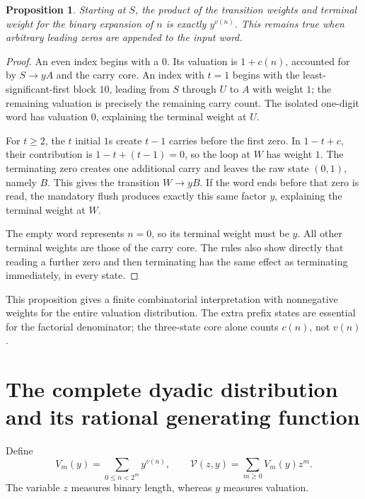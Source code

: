 \documentclass[11pt]{article}
\newtheorem{proposition}[theorem]{Proposition}
\theoremstyle{definition}\newtheorem{definition}[theorem]{Definition}
\theoremstyle{remark}\newtheorem{remark}[theorem]{Remark}
\begin{document}
\begin{proposition}\label{prop:sixstate}
Starting at $S$, the product of the transition weights and terminal weight
for the binary expansion of $n$ is exactly $y^{v(n)}$. This remains true
when arbitrary leading zeros are appended to the input word.
\end{proposition}
\begin{proof}
An even index begins with a $0$. Its valuation is $1+c(n)$, accounted for
by $S\to yA$ and the carry core. An index with $t=1$ begins with the
least-significant-first block $10$, leading from $S$ through $U$ to $A$
with weight $1$; the remaining valuation is precisely the remaining
carry count. The isolated one-digit word has valuation $0$, explaining
the terminal weight at $U$.

For $t\geq2$, the $t$ initial $1$s create $t-1$ carries before the first
zero. In $1-t+c$, their contribution is $1-t+(t-1)=0$, so the loop at $W$
has weight $1$. The terminating zero creates one additional carry and
leaves the raw state $(0,1)$, namely $B$. This gives the transition
$W\to yB$. If the word ends before that zero is read, the mandatory
flush produces exactly this same factor $y$, explaining the terminal
weight at $W$.

The empty word represents $n=0$, so its terminal weight must be $y$.
All other terminal weights are those of the carry core. The rules also
show directly that reading a further zero and then terminating has the
same effect as terminating immediately, in every state.
\end{proof}

This proposition gives a finite combinatorial interpretation with
nonnegative weights for the entire valuation distribution. The extra
prefix states are essential for the factorial denominator; the
three-state core alone counts $c(n)$, not $v(n)$.

\section{The complete dyadic distribution and its rational generating function}\label{sec:dist}

Define
\begin{equation}\label{eq:Vm}
 V_m(y)=\sum_{0\leq n<2^m}y^{v(n)},\qquad
 \mathcal V(z,y)=\sum_{m\geq0}V_m(y)z^m.
\end{equation}
The variable $z$ measures binary length, whereas $y$ measures valuation.
\end{document}
